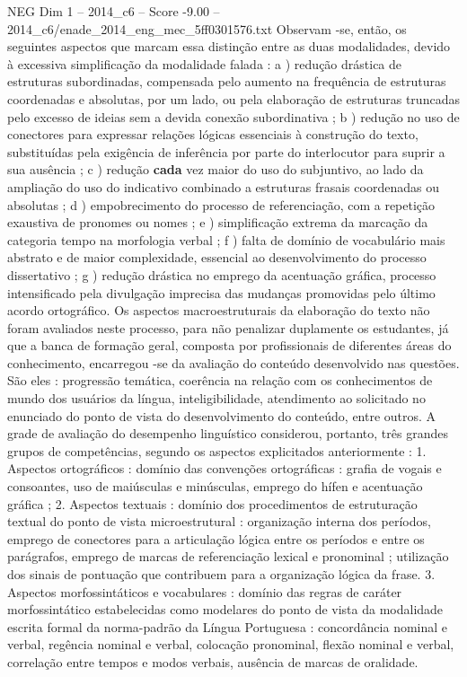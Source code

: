 \begin{textsample}{NEG Dim 1 – 2014\_c6 – Score -9.00 – 2014\_c6/enade\_2014\_eng\_mec\_5ff0301576.txt}
Observam -se, então, os seguintes aspectos que marcam essa distinção entre as duas modalidades, devido à excessiva simplificação da modalidade falada : a ) redução drástica de estruturas subordinadas, compensada pelo aumento na frequência de estruturas coordenadas e absolutas, por um lado, ou pela elaboração de estruturas truncadas pelo excesso de ideias sem a devida conexão subordinativa ; b ) redução no uso de conectores para expressar relações lógicas essenciais à construção do texto, substituídas pela exigência de inferência por parte do interlocutor para suprir a sua ausência ; c ) redução \textbf{cada} vez maior do uso do subjuntivo, ao lado da ampliação do uso do indicativo combinado a estruturas frasais coordenadas ou absolutas ; d ) empobrecimento do processo de referenciação, com a repetição exaustiva de pronomes ou nomes ; e ) simplificação extrema da marcação da categoria tempo na morfologia verbal ; f ) falta de domínio de vocabulário mais abstrato e de maior complexidade, essencial ao desenvolvimento do processo dissertativo ; g ) redução drástica no emprego da acentuação gráfica, processo intensificado pela divulgação imprecisa das mudanças promovidas pelo último acordo ortográfico.
Os aspectos macroestruturais da elaboração do texto não foram avaliados neste processo, para não penalizar duplamente os estudantes, já que a banca de formação geral, composta por profissionais de diferentes áreas do conhecimento, encarregou -se da avaliação do conteúdo desenvolvido nas questões.
São eles : progressão temática, coerência na relação com os conhecimentos de mundo dos usuários da língua, inteligibilidade, atendimento ao solicitado no enunciado do ponto de vista do desenvolvimento do conteúdo, entre outros.
A grade de avaliação do desempenho linguístico considerou, portanto, três grandes grupos de competências, segundo os aspectos explicitados anteriormente : 1.
Aspectos ortográficos : domínio das convenções ortográficas : grafia de vogais e consoantes, uso de maiúsculas e minúsculas, emprego do hífen e acentuação gráfica ; 2.
Aspectos textuais : domínio dos procedimentos de estruturação textual do ponto de vista microestrutural : organização interna dos períodos, emprego de conectores para a articulação lógica entre os períodos e entre os parágrafos, emprego de marcas de referenciação lexical e pronominal ; utilização dos sinais de pontuação que contribuem para a organização lógica da frase. 3.
Aspectos morfossintáticos e vocabulares : domínio das regras de caráter morfossintático estabelecidas como modelares do ponto de vista da modalidade escrita formal da norma-padrão da Língua Portuguesa : concordância nominal e verbal, regência nominal e verbal, colocação pronominal, flexão nominal e verbal, correlação entre tempos e modos verbais, ausência de marcas de oralidade.

\end{textsample}
